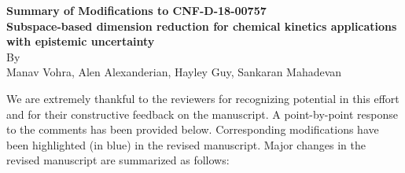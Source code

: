 \documentclass[11pt,final]{article}
\begin{document}
\begin{center}
{\bf Summary of Modifications to CNF-D-18-00757}\\[6pt]
{\bf Subspace-based dimension reduction for chemical kinetics applications with 
epistemic uncertainty}\\[6pt]
By \\
Manav Vohra, Alen Alexanderian, Hayley Guy, Sankaran Mahadevan 
\end{center}



\vspace*{1in}


We are extremely thankful to the reviewers for recognizing potential in this effort and 
for their constructive feedback on the manuscript. A point-by-point
response to the comments has been provided below. Corresponding modifications have been
highlighted (in blue) in the revised manuscript. Major changes in the revised manuscript
are summarized as follows:
\end{document}

